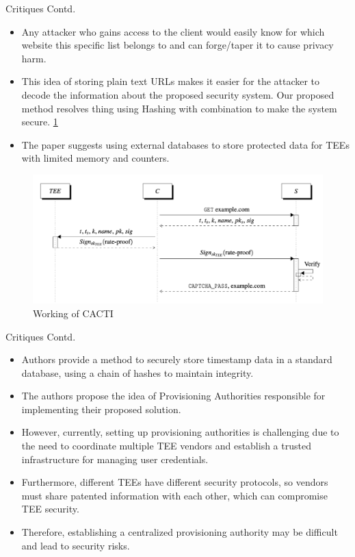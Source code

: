 \documentclass{beamer}
\begin{document}
\begin{frame}{Critiques Contd.}
	\begin{itemize}
		\item Any attacker who gains access to the client would easily know for which  website this specific list belongs to and can forge/taper it to cause privacy harm.
		\item This idea of storing plain text URLs makes it easier for the attacker to decode the information about the proposed security system. Our proposed method resolves thing using Hashing with combination to make the system secure. \ref{img2}
		\item The paper suggests using external databases to store protected data for TEEs with limited memory and counters.
	\end{itemize}
\end{frame}

\begin{frame}
	\begin{figure}
		\centering
		\includegraphics[scale=0.3]{img3.png}
		\caption{Working of CACTI}
		\label{img2}
	\end{figure}
\end{frame}

\begin{frame}{Critiques Contd.}
	\begin{itemize}
		\item Authors provide a method to securely store timestamp data in a standard database, using a chain of hashes to maintain integrity.
		\item The authors propose the idea of Provisioning Authorities responsible for implementing their proposed solution.
		\item However, currently, setting up provisioning authorities is challenging due to the need to coordinate multiple TEE vendors and establish a trusted infrastructure for managing user credentials.
		\item Furthermore, different TEEs have different security protocols, so vendors must share patented information with each other, which can compromise TEE security.
		\item Therefore, establishing a centralized provisioning authority may be difficult and lead to security risks.
	\end{itemize}
\end{frame}
\end{document}
